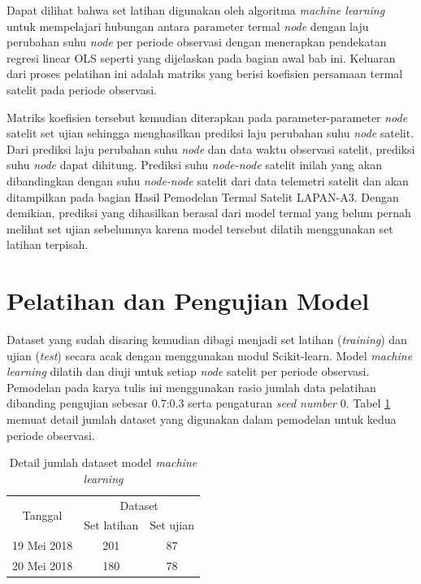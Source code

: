 Dapat dilihat bahwa set latihan digunakan oleh algoritma \textit{machine
learning} untuk mempelajari hubungan antara parameter termal \textit{node}
dengan laju perubahan suhu \textit{node} per periode observasi dengan
menerapkan pendekatan regresi linear OLS seperti yang dijelaskan pada bagian
awal bab ini. Keluaran dari proses pelatihan ini adalah matriks yang berisi
koefisien persamaan termal satelit pada periode observasi.

Matriks koefisien tersebut kemudian diterapkan pada parameter-parameter
\textit{node} satelit set ujian sehingga menghasilkan prediksi laju perubahan
suhu \textit{node} satelit. Dari prediksi laju perubahan suhu \textit{node} dan
data waktu observasi satelit, prediksi suhu \textit{node} dapat dihitung.
Prediksi suhu \textit{node-node} satelit inilah yang akan dibandingkan dengan
suhu \textit{node-node} satelit dari data telemetri satelit dan akan
ditampilkan pada bagian Hasil Pemodelan Termal Satelit LAPAN-A3. Dengan
demikian, prediksi yang dihasilkan berasal dari model termal yang belum pernah
melihat set ujian sebelumnya karena model tersebut dilatih menggunakan set
latihan terpisah.

\section{Pelatihan dan Pengujian Model}

Dataset yang sudah disaring kemudian dibagi menjadi set latihan
(\textit{training}) dan ujian (\textit{test}) secara acak dengan menggunakan modul
Scikit-learn. Model \textit{machine learning} dilatih dan diuji untuk setiap
\textit{node} satelit per periode observasi. Pemodelan pada karya tulis ini
menggunakan rasio jumlah data pelatihan dibanding pengujian sebesar 0.7:0.3
serta pengaturan \textit{seed number} 0. Tabel \ref{table:dataset} memuat
detail jumlah dataset yang digunakan dalam pemodelan untuk kedua periode
observasi.

\begin{table}[!ht]
\begin{center}
\caption{Detail jumlah dataset model \textit{machine learning}}
\label{table:dataset}
\begin{tabular}{|c|cc|}
\hline
\multirow{2}{*}{Tanggal} & \multicolumn{2}{c|}{Dataset}                 \\ \cline{2-3} 
                         & \multicolumn{1}{c|}{Set latihan} & Set ujian \\ \hline
19 Mei 2018              & \multicolumn{1}{c|}{201}         & 87        \\ \hline
20 Mei 2018              & \multicolumn{1}{c|}{180}         & 78        \\ \hline
\end{tabular}
\end{center}
\vspace{-5mm}
\end{table}

